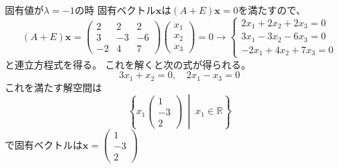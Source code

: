 \documentclass[10pt,a4paper]{ltjsarticle}
\begin{document}
\begin{enumerate}
\begin{enumerate}
              固有値が$\lambda =-1$の時
              固有ベクトル$\bm{x}$は$(A+E)\bm{x}=0$を満たすので、
              \begin{equation}
               (A+E)\bm{x}=
                \begin{pmatrix} 2&2&2\\ 3&-3&-6\\ -2&4&7\end{pmatrix}
                \begin{pmatrix} x_1\\ x_2\\ x_3\end{pmatrix}
                =0
                 \longrightarrow
                 \begin{cases}
                  2x_1 + 2x_2 + 2x_3 =0\\
                  3x_1 - 3x_2 - 6x_3 =0\\
                  -2x_1 + 4x_2 + 7x_3 =0
                 \end{cases}
              \end{equation}
              と連立方程式を得る。
              これを解くと次の式が得られる。
              \begin{equation}
                3x_1+x_2=0, \quad 2x_1-x_3=0
              \end{equation}
              これを満たす解空間は
              \begin{equation}
               \left\{
                x_1\begin{pmatrix} 1\\ -3\\ 2\end{pmatrix}
                \ \middle|\
                x_1 \in \mathbb{R}
               \right\}
              \end{equation}
              で固有ベクトルは$\bm{x}=\begin{pmatrix} 1\\ -3\\ 2\end{pmatrix}$


\end{enumerate}
\end{enumerate}
\end{document}
